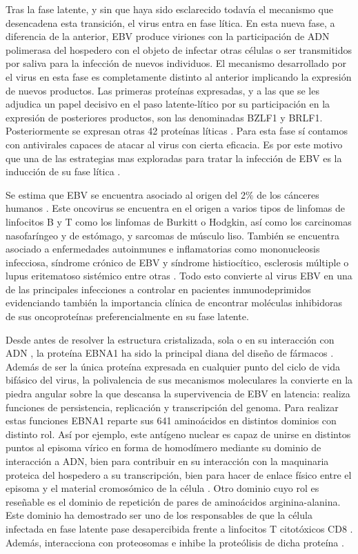 \documentclass[12pt,letterpaper]{article} %
\begin{document}
Tras la fase latente, y sin que haya sido esclarecido todavía el mecanismo que
desencadena esta transición, el virus entra en fase lítica. En esta nueva fase,
a diferencia de la anterior, EBV produce viriones con la participación de ADN
polimerasa del hospedero con el objeto de infectar otras células o ser
transmitidos por saliva para la infección de nuevos individuos. El mecanismo
desarrollado por el virus en esta fase es completamente distinto al anterior
implicando la expresión de nuevos productos. Las primeras proteínas expresadas,
y a las que se les adjudica un papel decisivo en el paso latente-lítico por su
participación en la expresión de posteriores productos, son las denominadas
BZLF1 y BRLF1. Posteriormente se expresan otras 42 proteínas
  líticas \cite{Traylen2015}. Para esta fase sí contamos con antivirales
capaces de atacar al virus con cierta eficacia. Es por este motivo que una de
las estrategias mas exploradas para tratar la infección de EBV es la inducción
de su fase lítica \cite{Lima2013a}.

Se estima que EBV se encuentra asociado al origen del 2$\%$ de los cánceres
humanos \cite{Parkin2006,Cohen2011,ZurHausen2015}. Este oncovirus se encuentra
en el origen a varios tipos de linfomas de linfocitos B y T como los linfomas de
Burkitt o Hodgkin, así como los carcinomas nasofaríngeo y de estómago, y
sarcomas de músculo liso. También se encuentra asociado a enfermedades
autoinmunes e inflamatorias como mononucleosis infecciosa, síndrome crónico de
EBV y síndrome histiocítico, esclerosis múltiple o lupus eritematoso sistémico
entre otras \cite{Parkin2006,Cohen2011,Young2016,Draborg2013,Niller2008}. Todo
esto convierte al virus EBV en una de las principales infecciones a controlar en
pacientes inmunodeprimidos evidenciando también la importancia clínica de
encontrar moléculas inhibidoras de sus oncoproteínas preferencialmente en su
fase latente.

Desde antes de resolver la estructura cristalizada, sola o en su interacción con
ADN \cite{Bochkarev1995,Bochkarev1996c}, la proteína EBNA1 ha sido la principal
diana del diseño de fármacos \cite{Orlowski1990,Henderson1982}. Además de ser la
única proteína expresada en cualquier punto del ciclo de vida bifásico del
virus, la polivalencia de sus mecanismos moleculares la convierte en la piedra
angular sobre la que descansa la supervivencia de EBV en latencia: realiza
funciones de persistencia, replicación y transcripción del genoma. Para realizar
estas funciones EBNA1 reparte sus 641 aminoácidos en distintos dominios con
distinto rol. Así por ejemplo, este antígeno nuclear es capaz de unirse en
distintos puntos al episoma vírico en forma de homodímero mediante su dominio de
interacción a ADN, bien para contribuir en su interacción con la maquinaria
proteica del hospedero a su transcripción, bien para hacer de enlace físico
entre el episoma y el material cromosómico de la célula \cite{Bochkarev1996c}.
Otro dominio cuyo rol es reseñable es el dominio de repetición de pares de
aminoácidos arginina-alanina. Este dominio ha demostrado ser uno de los
responsables de que la célula infectada en fase latente pase desapercibida
frente a linfocitos T citotóxicos CD8 \cite{Lee2004}. Además, interacciona con
proteosomas e inhibe la proteólisis de dicha proteína \cite{Dantuma2000}.
\end{document}
